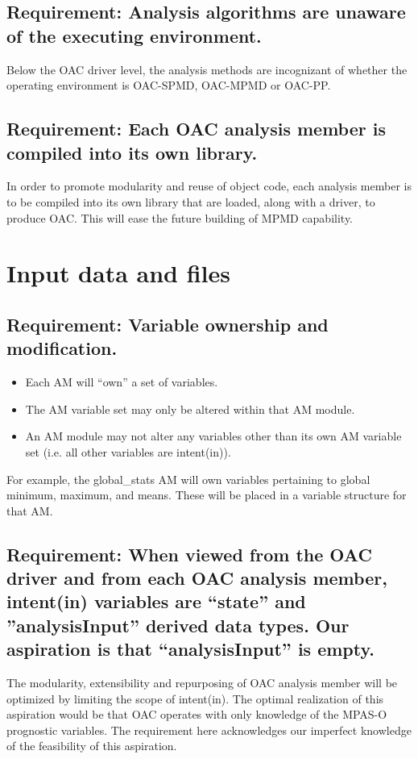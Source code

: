 \documentclass[11pt]{report}
\begin{document}
\subsection{Requirement: Analysis algorithms are unaware of the executing environment.}
Below the OAC driver level, the analysis methods are incognizant of whether the operating environment is OAC-SPMD, OAC-MPMD or OAC-PP.

\subsection{Requirement: Each OAC analysis member is compiled into its own library.}
In order to promote modularity and reuse of object code, each analysis member is to be compiled into its own library that are loaded, along with a driver, to produce OAC.  This will ease the future building of MPMD capability.

\newpage
\section{Input data and files}

\subsection{{\color{red} Requirement}: Variable ownership and modification.}
\begin{itemize}
\item Each AM will ``own'' a set of variables.
\item The AM variable set may only be altered within that AM module.
\item An AM module may not alter any variables other than its own AM variable set (i.e. all other variables are intent(in)).
\end{itemize}
For example, the global\_stats AM will own variables pertaining to global minimum, maximum, and means.  These will be placed in a variable structure for that AM.

\subsection{Requirement: When viewed from the OAC driver and from each OAC analysis member, intent(in) variables are ``state'' and ''analysisInput'' derived data types. Our aspiration is that ``analysisInput'' is empty.}
The modularity, extensibility and repurposing of OAC analysis member will be optimized by limiting the scope of intent(in). The optimal realization of this aspiration would be that OAC operates with only knowledge of the MPAS-O prognostic variables. The requirement here acknowledges our imperfect knowledge of the feasibility of this aspiration.
\end{document}
